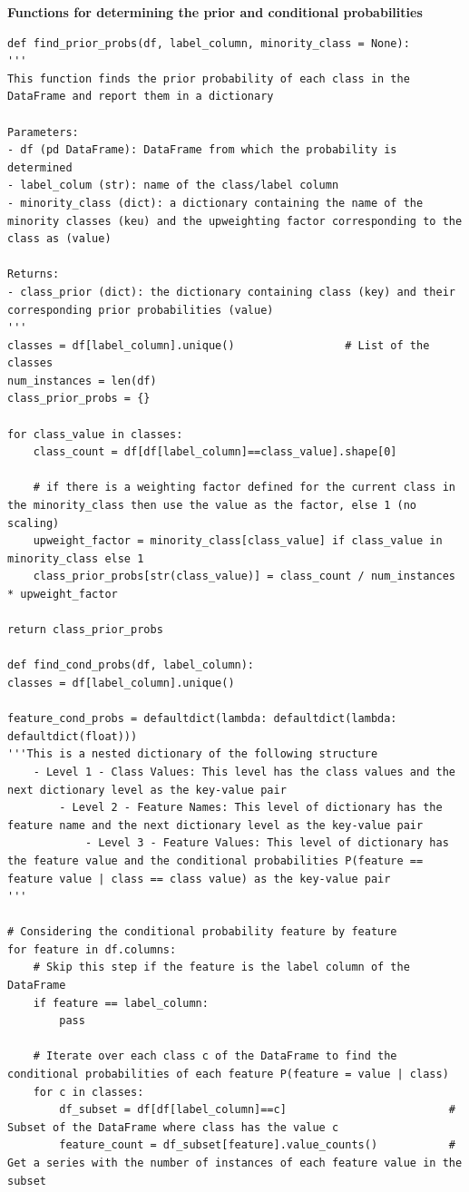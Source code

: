 \documentclass[a4paper]{article}
\begin{document}
\textbf{Functions for determining the prior and conditional probabilities}
\begin{lstlisting}
def find_prior_probs(df, label_column, minority_class = None):
'''
This function finds the prior probability of each class in the DataFrame and report them in a dictionary

Parameters:
- df (pd DataFrame): DataFrame from which the probability is determined
- label_colum (str): name of the class/label column
- minority_class (dict): a dictionary containing the name of the minority classes (keu) and the upweighting factor corresponding to the class as (value)

Returns:
- class_prior (dict): the dictionary containing class (key) and their corresponding prior probabilities (value)
'''
classes = df[label_column].unique()                 # List of the classes
num_instances = len(df)
class_prior_probs = {}

for class_value in classes:
    class_count = df[df[label_column]==class_value].shape[0]
    
    # if there is a weighting factor defined for the current class in the minority_class then use the value as the factor, else 1 (no scaling)
    upweight_factor = minority_class[class_value] if class_value in minority_class else 1      
    class_prior_probs[str(class_value)] = class_count / num_instances * upweight_factor

return class_prior_probs

def find_cond_probs(df, label_column):
classes = df[label_column].unique()

feature_cond_probs = defaultdict(lambda: defaultdict(lambda: defaultdict(float)))
'''This is a nested dictionary of the following structure
    - Level 1 - Class Values: This level has the class values and the next dictionary level as the key-value pair
        - Level 2 - Feature Names: This level of dictionary has the feature name and the next dictionary level as the key-value pair
            - Level 3 - Feature Values: This level of dictionary has the feature value and the conditional probabilities P(feature == feature value | class == class value) as the key-value pair 
'''

# Considering the conditional probability feature by feature
for feature in df.columns:
    # Skip this step if the feature is the label column of the DataFrame
    if feature == label_column:
        pass
    
    # Iterate over each class c of the DataFrame to find the conditional probabilities of each feature P(feature = value | class)
    for c in classes: 
        df_subset = df[df[label_column]==c]                         # Subset of the DataFrame where class has the value c
        feature_count = df_subset[feature].value_counts()           # Get a series with the number of instances of each feature value in the subset


\end{lstlisting}
\end{document}
